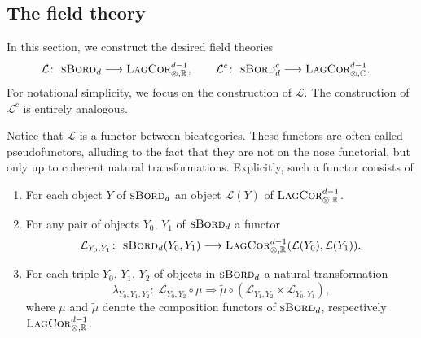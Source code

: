 \documentclass[pdftex]{sigma}
\numberwithin{equation}{section}
\newcommand{\LagCor}{\textsc{LagCor}}
\newcommand{\R}{\mathbb{R}}
\newcommand{\C}{\mathbb{C}}
\newcommand{\sBord}{\textsc{sBord}}
\begin{document}
\subsection{The field theory} \label{SectionFermionicFieldTheory}

In this section, we construct the desired field theories
\begin{align*}
 \mathcal{L} \colon\ \sBord_d &\longrightarrow \LagCor^{d-1}_{\otimes, \R},\qquad
 \mathcal{L}^c \colon\ \sBord_d^c \longrightarrow \LagCor^{d-1}_{\otimes, \C}.
\end{align*}
For notational simplicity, we focus on the construction of $\mathcal{L}$.
The construction of $\mathcal{L}^c$ is entirely analogous.

Notice that $\mathcal{L}$ is a functor between bicategories.
These functors are often called pseudofunctors, alluding to the fact that they are not on the nose functorial, but only up to coherent natural transformations.
Explicitly, such a functor consists of
\begin{enumerate}\itemsep=0pt
\item[(1)]
For each object $Y$ of $\sBord_d$ an object $\mathcal{L}(Y)$ of $\LagCor_{\otimes, \R}^{d-1}$.
\item[(2)]
For any pair of objects $Y_0$, $Y_1$ of $\sBord_d$ a functor
\begin{equation}
\label{Lfunctor}
\mathcal{L}_{Y_0, Y_1}\colon\ \sBord_d(Y_0, Y_1) \longrightarrow \LagCor_{\otimes, \R}^{d-1}(\mathcal{L}(Y_0), \mathcal{L}(Y_1)).
\end{equation}
\item[(3)]
For each triple $Y_0$, $Y_1$, $Y_2$ of objects in $\sBord_d$ a natural transformation
\begin{equation}
\label{LambdaTransformation}
 \lambda_{Y_0, Y_1, Y_2}\colon\ \mathcal{L}_{Y_0, Y_2} \circ \mu \Longrightarrow \tilde{\mu} \circ (\mathcal{L}_{Y_1, Y_2} \times \mathcal{L}_{Y_0, Y_1}),
\end{equation}
where $\mu$ and $\tilde{\mu}$ denote the composition functors of $\sBord_d$, respectively $\LagCor_{\otimes, \R}^{d-1}$.
\end{enumerate}
\end{document}
